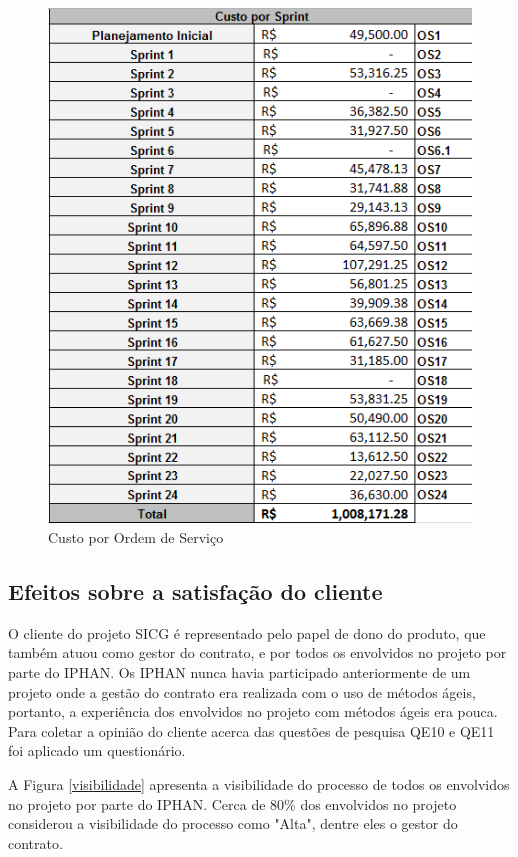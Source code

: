 \begin{figure}[H]
		\centering
			\includegraphics[scale=1.0]{figuras/custo.png}
		\caption{Custo por Ordem de Serviço}
		\label{custo}
\end{figure}

\subsection[Efeitos sobre a satisfação do cliente]{Efeitos sobre a satisfação do cliente}

O cliente do projeto SICG é representado pelo papel de dono do produto, que também atuou como gestor do contrato, e por todos os envolvidos no projeto por parte do IPHAN. Os IPHAN nunca havia participado anteriormente de um projeto onde a gestão do contrato era realizada com o uso de métodos ágeis, portanto, a experiência dos envolvidos no projeto com métodos ágeis era pouca. Para coletar a opinião do cliente acerca das questões de pesquisa QE10  e QE11 foi aplicado um questionário.

A Figura \ref{visibilidade} apresenta a visibilidade do processo de todos os envolvidos no projeto por parte do IPHAN. Cerca de 80\% dos envolvidos no projeto considerou a visibilidade do processo como "Alta", dentre eles o gestor do contrato.

